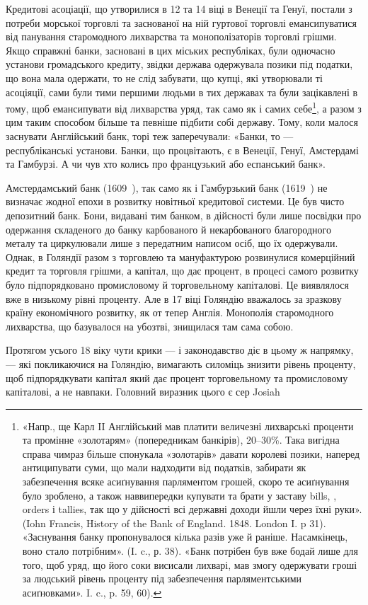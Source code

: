 Кредитові асоціації, що утворилися в 12 та 14 віці в Венеції та Генуї,
постали з потреби морської торговлі та заснованої на ній гуртової торговлі
емансипуватися від панування старомодного лихварства та монополізаторів
торговлі грішми. Якщо справжні банки, засновані в цих міських республіках,
були одночасно установи громадського кредиту, звідки держава одержувала позики
під податки, що вона мала одержати, то не слід забувати, що купці, які утворювали
ті асоціяції, сами були тими першими людьми в тих державах та були
зацікавлені в тому, щоб емансипувати від лихварства уряд, так само як і самих
себе\footnote{
«Напр., ще Карл II Англійський мав платити величезні лихварські проценти та промінне
«золотарям» (попередникам банкірів), 20--30\%. Така вигідна справа чимраз більше спонукала «золотарів»
давати королеві позики, наперед антиципувати суми, що мали надходити від податків, забирати
як забезпечення всяке асиґнування парляментом грошей, скоро те асиґнування було зроблено, а також
наввипередки купувати та брати у заставу bills, , orders і tallies, так що у дійсності всі державні
доходи
йшли через їхні руки». (Iohn Francis, History of the Bank of England. 1848. London I. p 31).
«Заснування
банку пропонувалося кілька разів уже й раніше. Насамкінець, воно стало потрібним». (I. c., р. 38).
«Банк потрібен був вже бодай лише для того, щоб уряд, що його соки висисали лихварі, мав змогу
одержувати гроші за людський рівень проценту під забезпечення парляментськими асиґновками».
I. c., p. 59, 60).
}, а разом з цим таким способом більше та певніше підбити собі державу.
Тому, коли малося заснувати Англійський банк, торі теж заперечували: «Банки,
то — республіканські установи. Банки, що процвітають, є в Венеції, Генуї,
Амстердамі та Гамбурзі. А чи чув хто колись про французький або еспанський
банк».

Амстердамський банк (1609~), так само як і Гамбурзький банк (1619~)
не визначає жодної епохи в розвитку новітньої кредитової системи. Це був
чисто депозитний банк. Бони, видавані тим банком, в дійсності були лише
посвідки про одержання складеного до банку карбованого й некарбованого благородного
металу та циркулювали лише з передатним написом осіб, що їх одержували.
Однак, в Голяндії разом з торговлею та мануфактурою розвинулися
комерційний кредит та торговля грішми, а капітал, що дає процент, в процесі
самого розвитку було підпорядковано промисловому й торговельному капіталові.
Це виявлялося вже в низькому рівні проценту. Але в 17 віці Голяндію вважалось
за зразкову країну економічного розвитку, як от тепер Англія. Монополія
старомодного лихварства, що базувалося на убозтві, знищилася там сама собою.

Протягом усього 18 віку чути крики — і законодавство діє в цьому ж напрямку,
— які покликаючися на Голяндію, вимагають силоміць знизити рівень
проценту, щоб підпорядкувати капітал який дає процент торговельному та
промисловому капіталові, а не навпаки. Головний виразник цього є сер Josiah
\parbreak{}  %
